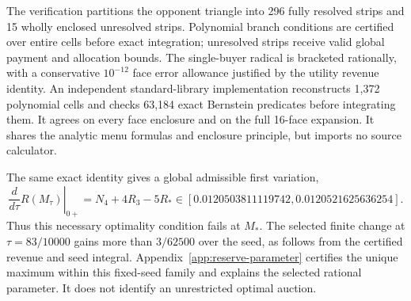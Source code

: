 The verification partitions the opponent triangle into 296 fully resolved
strips and 15 wholly enclosed unresolved strips. Polynomial branch
conditions are certified over entire cells before exact integration;
unresolved strips receive valid global payment and allocation bounds.
The single-buyer radical is bracketed rationally, with a conservative
$10^{-12}$ face error allowance justified by the utility revenue identity.
An independent standard-library implementation reconstructs 1,372
polynomial cells and checks 63,184 exact Bernstein predicates before
integrating them. It agrees on every face enclosure and on the full
16-face expansion. It shares the analytic menu formulas and enclosure
principle, but imports no source calculator.

The same exact identity gives a global admissible first variation,
\[
 \left.\frac{d}{d\tau}R(M_\tau)\right|_{0+}
       =N_4+4R_3-5R_*
       \in[0.0120503811119742,0.0120521625636254].
\]
Thus this necessary optimality condition fails at $M_*$. The selected finite change at $\tau=83/10000$ gains more than $3/62500$
over the seed, as follows from the certified revenue and seed integral. Appendix~\ref{app:reserve-parameter} certifies the unique maximum within
this fixed-seed family and explains the selected rational parameter.
It does not identify an unrestricted optimal auction.
